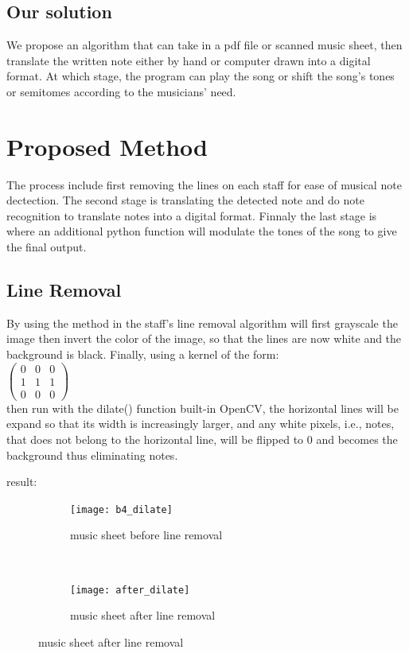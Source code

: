\documentclass[a4paper,12pt]{report}
\begin{document}
\subsection{Our solution}
We propose an algorithm that can take in a pdf file or scanned music sheet, then 
translate the written note either by hand or computer drawn into a digital format.
At which stage, the program can play the song or shift the song's tones or semitomes 
according to the musicians' need.

\clearpage

\section{Proposed Method}
The process include first removing the lines on each staff for ease of musical
note dectection.  The second stage is translating the detected note and do note
recognition to translate notes into a digital format. Finnaly the last stage is
where an additional python function will modulate the tones of the song to give
the final output. 


\subsection{Line Removal}
By using the method in \textcite{Gomez2017} the staff's line removal algorithm
will first grayscale the image then invert the color of the image, so that the
lines are now white and the background is black. Finally, using a kernel of the
form: \\
$
\begin{pmatrix}
	0 & 0 & 0\\
	1 & 1 & 1\\
	0 & 0 & 0
\end{pmatrix}
$\\
then run with the dilate() function built-in OpenCV, the horizontal lines will
be expand so that its width is increasingly larger, and any white pixels, i.e.,
notes, that does not belong to the horizontal line, will be flipped to 0 and
becomes the background thus eliminating notes.

result:
\begin{figure}[H]
    \centering
    \begin{subfigure}[t]{0.5\textwidth}
        \centering
        \texttt{[image: b4\_dilate]}
        \caption{music sheet before line removal}
    \end{subfigure}%
    ~ 
    \begin{subfigure}[t]{0.5\textwidth}
        \centering
        \texttt{[image: after\_dilate]}
        \caption{music sheet after line removal}
    \end{subfigure}
\end{figure}
\end{document}
